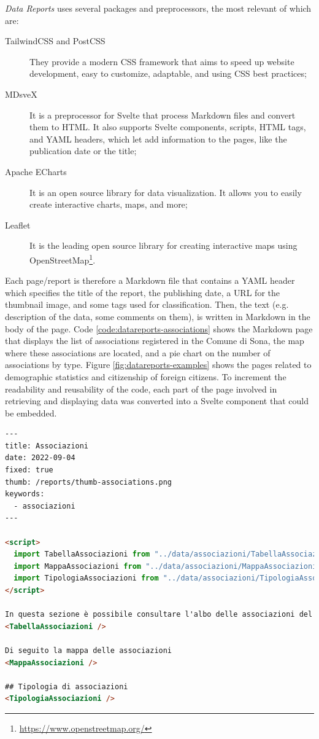 \textit{Data Reports} uses several packages and preprocessors, the most relevant of which are:

\begin{description}
  \item[TailwindCSS and PostCSS] They provide a modern \acs{CSS} framework that aims to speed up website development, easy to customize, adaptable, and using \acs{CSS} best practices;
  \item[MDsveX] It is a preprocessor for Svelte that process Markdown files and convert them to \acs{HTML}. It also supports Svelte components, scripts, \acs{HTML} tags, and YAML headers, which let add information to the pages, like the publication date or the title;
  \item[Apache ECharts] It is an open source library for data visualization. It allows you to easily create interactive charts, maps, and more;
  \item[Leaflet] It is the leading open source library for creating interactive maps using OpenStreetMap\footnote{\url{https://www.openstreetmap.org/}}.
\end{description}

Each page/report is therefore a Markdown file that contains a YAML header which specifies the title of the report, the publishing date, a \ac{URL} for the thumbnail image, and some tags used for classification. Then, the text (e.g. description of the data, some comments on them), is written in Markdown in the body of the page. Code \ref{code:datareports-associations} shows the Markdown page that displays the list of associations registered in the Comune di Sona, the map where these associations are located, and a pie chart on the number of associations by type. Figure \ref{fig:datareports-examples} shows the pages related to demographic statistics and citizenship of foreign citizens. To increment the readability and reusability of the code, each part of the page involved in retrieving and displaying data was converted into a Svelte component that could be embedded.

\begin{lstlisting}[language=HTML,caption={"Associazioni" report page in Markdown.},label=code:datareports-associations]
---
title: Associazioni
date: 2022-09-04
fixed: true
thumb: /reports/thumb-associations.png
keywords:
  - associazioni
---

<script>
  import TabellaAssociazioni from "../data/associazioni/TabellaAssociazioni.svelte";
  import MappaAssociazioni from "../data/associazioni/MappaAssociazioni.svelte";
  import TipologiaAssociazioni from "../data/associazioni/TipologiaAssociazioni.svelte";
</script>

In questa sezione è possibile consultare l'albo delle associazioni del Comune di Sona, con le relative informazioni.
<TabellaAssociazioni />

Di seguito la mappa delle associazioni
<MappaAssociazioni />

## Tipologia di associazioni
<TipologiaAssociazioni />
\end{lstlisting}

